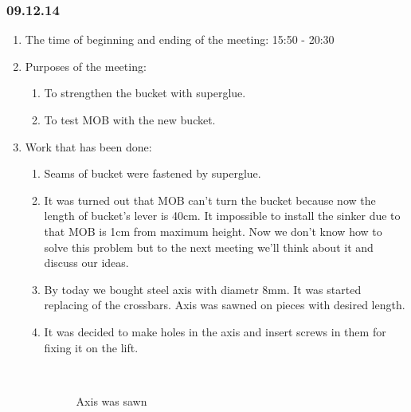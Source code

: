 \subsubsection{09.12.14}

\begin{enumerate}
	\item The time of beginning and ending of the meeting:
	15:50 - 20:30
	\item Purposes of the meeting:
	\begin{enumerate}
	  \item To strengthen the bucket with superglue.
	  
	  \item To test MOB with the new bucket.
	  
    \end{enumerate}
	\item Work that has been done:
	\begin{enumerate}
	  \item Seams of bucket were fastened by superglue.
	  
	  \item It was turned out that MOB can't turn the bucket because now the length of bucket's lever is 40cm. It impossible to install the sinker due to that MOB is 1cm from maximum height. Now we don't know how to solve this problem but to the next meeting we'll think about it and discuss our ideas.
	  
	  \item By today we bought steel axis with diametr 8mm. It was started replacing of the crossbars. Axis was sawned on pieces with desired length.
	  
	  \item It was decided to make holes in the axis and insert screws in them for fixing it on the lift.
	  
	  \begin{figure}[H]
	  	\begin{minipage}[h]{0.2\linewidth}
	  		\center  
	  	\end{minipage}
	  	\begin{minipage}[h]{0.6\linewidth}
	  		\caption{Axis was sawn}
	  	\end{minipage}
	  \end{figure}
      

\end{enumerate}
\end{enumerate}
